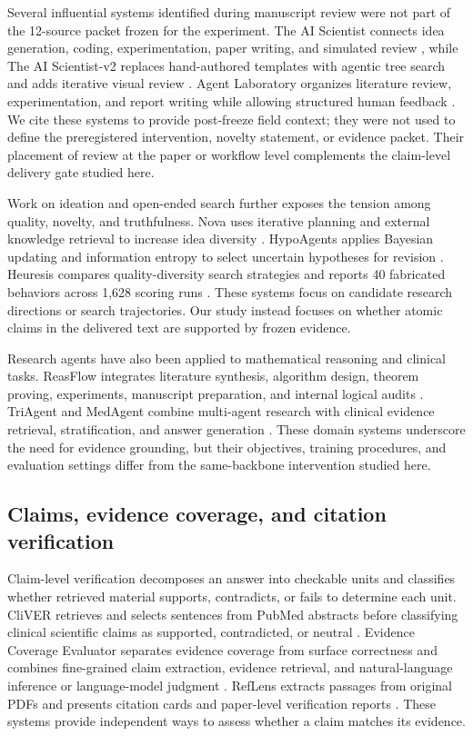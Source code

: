 \documentclass[11pt]{article}
\begin{document}
Several influential systems identified during manuscript review were not part of the 12-source packet frozen for the experiment. The AI Scientist connects idea generation, coding, experimentation, paper writing, and simulated review \cite{aiscientist}, while The AI Scientist-v2 replaces hand-authored templates with agentic tree search and adds iterative visual review \cite{aiscientistv2}. Agent Laboratory organizes literature review, experimentation, and report writing while allowing structured human feedback \cite{agentlab}. We cite these systems to provide post-freeze field context; they were not used to define the preregistered intervention, novelty statement, or evidence packet. Their placement of review at the paper or workflow level complements the claim-level delivery gate studied here.

Work on ideation and open-ended search further exposes the tension among quality, novelty, and truthfulness. Nova uses iterative planning and external knowledge retrieval to increase idea diversity \cite{nova}. HypoAgents applies Bayesian updating and information entropy to select uncertain hypotheses for revision \cite{hypo}. Heuresis compares quality-diversity search strategies and reports 40 fabricated behaviors across 1,628 scoring runs \cite{heuresis}. These systems focus on candidate research directions or search trajectories. Our study instead focuses on whether atomic claims in the delivered text are supported by frozen evidence.

Research agents have also been applied to mathematical reasoning and clinical tasks. ReasFlow integrates literature synthesis, algorithm design, theorem proving, experiments, manuscript preparation, and internal logical audits \cite{reasflow}. TriAgent and MedAgent combine multi-agent research with clinical evidence retrieval, stratification, and answer generation \cite{triagent,medagent}. These domain systems underscore the need for evidence grounding, but their objectives, training procedures, and evaluation settings differ from the same-backbone intervention studied here.

\subsection{Claims, evidence coverage, and citation verification}

Claim-level verification decomposes an answer into checkable units and classifies whether retrieved material supports, contradicts, or fails to determine each unit. CliVER retrieves and selects sentences from PubMed abstracts before classifying clinical scientific claims as supported, contradicted, or neutral \cite{cliver}. Evidence Coverage Evaluator separates evidence coverage from surface correctness and combines fine-grained claim extraction, evidence retrieval, and natural-language inference or language-model judgment \cite{ece}. RefLens extracts passages from original PDFs and presents citation cards and paper-level verification reports \cite{reflens}. These systems provide independent ways to assess whether a claim matches its evidence.
\end{document}
